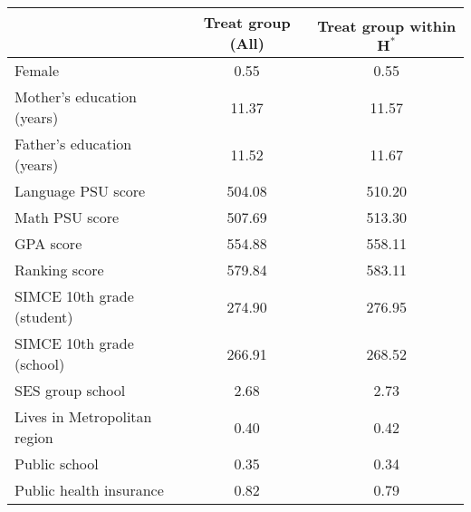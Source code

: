 \begin{tabular}{lcc}
  \hline
 & \textbf{Treat group (All)} & \textbf{Treat group within $\mathbf{H^*}$} \\ 
  \hline
Female & 0.55 & 0.55 \\ 
  Mother's education (years) & 11.37 & 11.57 \\ 
  Father's education (years) & 11.52 & 11.67 \\ 
  Language PSU score & 504.08 & 510.20 \\ 
  Math PSU score & 507.69 & 513.30 \\ 
  GPA score & 554.88 & 558.11 \\ 
  Ranking score & 579.84 & 583.11 \\ 
  SIMCE 10th grade (student) & 274.90 & 276.95 \\ 
  SIMCE 10th grade (school) & 266.91 & 268.52 \\ 
  SES group school & 2.68 & 2.73 \\ 
  Lives in Metropolitan region & 0.40 & 0.42 \\ 
  Public school & 0.35 & 0.34 \\ 
  Public health insurance & 0.82 & 0.79 \\ 
   \hline
\end{tabular}